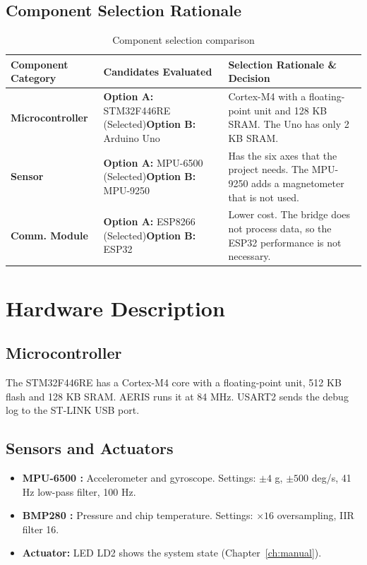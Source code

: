 \documentclass[12pt,a4paper]{report}
\begin{document}
\section{Component Selection Rationale}
\begin{table}[H]
\centering
\caption{Component selection comparison}
\label{tab:component_selection}
\small
\begin{tabularx}{\textwidth}{l X X}
\toprule
\textbf{Component Category} & \textbf{Candidates Evaluated} & \textbf{Selection Rationale \& Decision} \\
\midrule
\textbf{Microcontroller} & \textbf{Option A:} STM32F446RE (Selected)\newline \textbf{Option B:} Arduino Uno &
Cortex-M4 with a floating-point unit and 128 KB SRAM. The Uno has only 2 KB SRAM. \\
\addlinespace
\textbf{Sensor} & \textbf{Option A:} MPU-6500 (Selected)\newline \textbf{Option B:} MPU-9250 &
Has the six axes that the project needs. The MPU-9250 adds a magnetometer that is not used. \\
\addlinespace
\textbf{Comm. Module} & \textbf{Option A:} ESP8266 (Selected)\newline \textbf{Option B:} ESP32 &
Lower cost. The bridge does not process data, so the ESP32 performance is not necessary. \\
\bottomrule
\end{tabularx}
\end{table}

\chapter{Hardware Description}
\section{Microcontroller}
The STM32F446RE \cite{stm32} has a Cortex-M4 core with a floating-point unit, 512 KB flash and 128 KB SRAM. AERIS runs it at 84 MHz. USART2 sends the debug log to the ST-LINK USB port.

\section{Sensors and Actuators}
\begin{itemize}
\item \textbf{MPU-6500 \cite{mpu6500}:} Accelerometer and gyroscope. Settings: $\pm4$ g, $\pm500$ deg/s, 41 Hz low-pass filter, 100 Hz.
\item \textbf{BMP280 \cite{bmp280}:} Pressure and chip temperature. Settings: $\times16$ oversampling, IIR filter 16.
\item \textbf{Actuator:} LED LD2 shows the system state (Chapter~\ref{ch:manual}).
\end{itemize}
\end{document}
